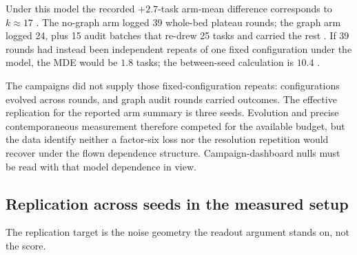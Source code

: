 Under this model the recorded $+2.7$-task arm-mean difference corresponds
to $k\approx17$ . The no-graph arm logged 39 whole-bed plateau rounds;
the graph arm logged 24, plus 15 audit batches that re-drew 25 tasks and
carried the rest . If 39 rounds had instead been independent repeats
of one fixed configuration under the model, the MDE would be $1.8$ tasks;
the between-seed calculation is $10.4$ .

The campaigns did not supply those fixed-configuration repeats: configurations
evolved across rounds, and graph audit rounds carried outcomes. The effective
replication for the reported arm summary is three seeds. Evolution and precise
contemporaneous measurement therefore competed for the available budget, but
the data identify neither a factor-six loss nor the resolution repetition
would recover under the flown dependence structure. Campaign-dashboard nulls
must be read with that model dependence in view.



\subsection{Replication across seeds in the measured setup}
\label{sec:replication}

The replication target is the noise geometry the readout
argument stands on, not the score.


